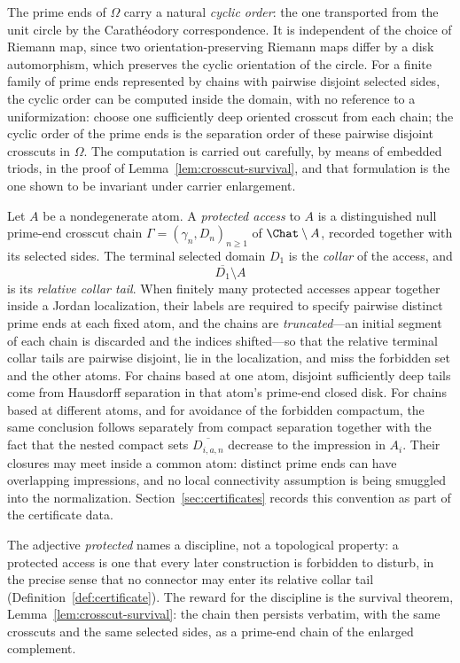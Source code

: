The prime ends of $\Omega$ carry a natural \emph{cyclic order}: the one
transported from the unit circle by the Carath\'eodory correspondence.
It is independent of the choice of Riemann map, since two
orientation-preserving Riemann maps differ by a disk automorphism, which
preserves the cyclic orientation of the circle.  For a finite family of
prime ends represented by chains with pairwise disjoint selected sides,
the cyclic order can be computed inside the domain, with no reference to
a uniformization: choose one sufficiently deep oriented crosscut from
each chain; the cyclic order of the prime ends is the separation order of
these pairwise disjoint crosscuts in $\Omega$.  The computation is
carried out carefully, by means of embedded triods, in the proof of
Lemma~\ref{lem:crosscut-survival}, and that formulation is the one shown
to be invariant under carrier enlargement.

\begin{definition}\label{def:A-protected}
Let $A$ be a nondegenerate atom.  A \emph{protected access} to $A$ is a
distinguished null prime-end crosscut chain
$\Gamma=(\gamma_n,D_n)_{n\ge1}$ of $\Chat\setminus A$, recorded together
with its selected sides.  The terminal selected domain $D_1$ is the
\emph{collar} of the access, and
\[
 \overline{D_1}\setminus A
\]
is its \emph{relative collar tail}.  When finitely many protected accesses
appear together inside a Jordan localization, their labels are required to
specify pairwise distinct prime ends at each fixed atom, and the chains are
\emph{truncated}---an initial segment of each chain is discarded and the
indices shifted---so that the relative terminal collar tails are pairwise
disjoint, lie in the localization, and miss the forbidden set and the other
atoms.  For chains based at one atom, disjoint sufficiently deep tails come
from Hausdorff separation in that atom's prime-end closed disk.  For chains
based at different atoms, and for avoidance of the forbidden compactum, the
same conclusion follows separately from compact separation together with
the fact that the nested compact sets
$\overline{D_{i,a,n}}$ decrease to the impression in $A_i$.
Their closures may meet inside a common atom: distinct prime ends can have
overlapping impressions, and no local connectivity assumption is being
smuggled into the normalization.  Section~\ref{sec:certificates} records
this convention as part of the certificate data.
\end{definition}

The adjective \emph{protected} names a discipline, not a topological
property: a protected access is one that every later construction is
forbidden to disturb, in the precise sense that no connector may enter
its relative collar tail (Definition~\ref{def:certificate}).  The reward for the
discipline is the survival theorem, Lemma~\ref{lem:crosscut-survival}:
the chain then persists verbatim, with the same crosscuts and the same
selected sides, as a prime-end chain of the enlarged complement.

